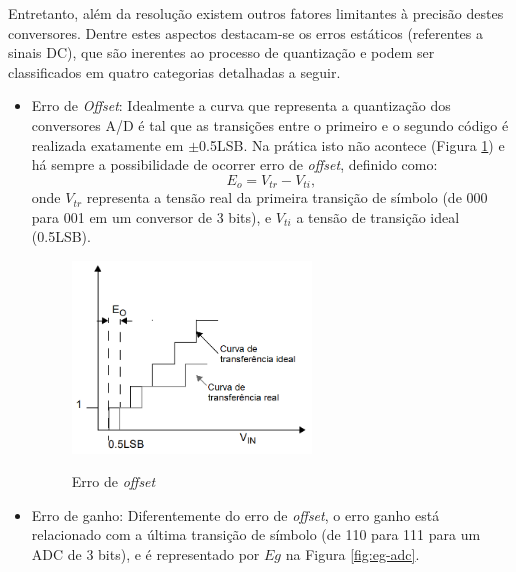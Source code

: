 \documentclass[oneside,openright,12pt]{ufsm_2015} %
\begin{document}
Entretanto, além da resolução existem outros fatores limitantes à precisão destes conversores. Dentre estes aspectos destacam-se os erros estáticos (referentes a sinais DC), que são inerentes ao processo de quantização e podem ser classificados em quatro categorias detalhadas a seguir.

\begin{itemize}
    \item Erro de \textit{Offset}:
    Idealmente a curva que representa a quantização dos conversores A/D é tal que as transições entre o primeiro e o segundo código é realizada exatamente em $\pm$0.5LSB. Na prática isto não acontece (Figura \ref{fig:offset-adc}) e há sempre a possibilidade de ocorrer erro de \textit{offset}, definido como:
    \begin{equation}
        E_o = V_{tr} - V_{ti},
    \end{equation}
    onde $V_{tr}$ representa a tensão real da primeira transição de símbolo (de 000 para 001 em um conversor de 3 bits), e $V_{ti}$ a tensão de transição ideal (0.5LSB).  
    
    \begin{figure}[ht]
    \caption{\label{exepretex} Erro de \textit{offset}}
    \centering
    \includegraphics[width=0.6\textwidth]{figuras/erro_offset.png}
    \vspace{\baselineskip} %
        \label{fig:offset-adc}
    \end{figure}
    
    \item Erro de ganho:
    Diferentemente do erro de \textit{offset}, o erro ganho está relacionado com a última transição de símbolo (de 110 para 111 para um ADC de 3 bits), e é representado por $Eg$ na Figura \ref{fig:eg-adc}.
    

\end{itemize}
\end{document}
